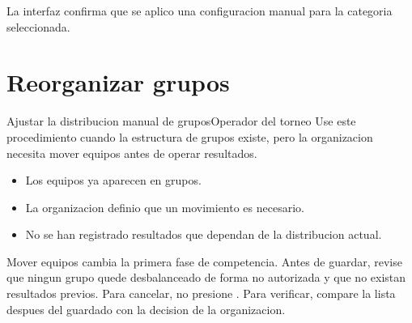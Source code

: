 \begin{resultadoesperado}
La interfaz confirma que se aplico una configuracion manual para la categoria seleccionada.
\end{resultadoesperado}

\section{Reorganizar grupos}


\begin{procedimiento}{Ajustar la distribucion manual de grupos}{Operador del torneo}
Use este procedimiento cuando la estructura de grupos existe, pero la organizacion necesita mover equipos antes de operar resultados.
\end{procedimiento}

\begin{precondiciones}
\begin{itemize}
    \item Los equipos ya aparecen en grupos.
    \item La organizacion definio que un movimiento es necesario.
    \item No se han registrado resultados que dependan de la distribucion actual.
\end{itemize}
\end{precondiciones}


\begin{operacionsensible}
Mover equipos cambia la primera fase de competencia. Antes de guardar, revise que ningun grupo quede desbalanceado de forma no autorizada y que no existan resultados previos. Para cancelar, no presione . Para verificar, compare la lista despues del guardado con la decision de la organizacion.
\end{operacionsensible}

